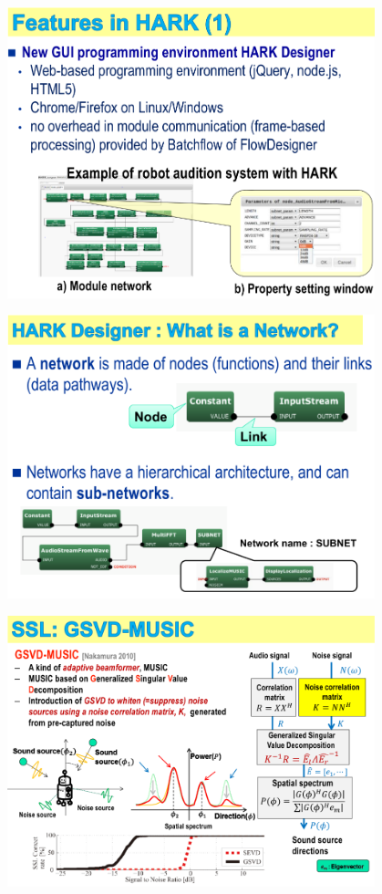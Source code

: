 \documentclass[xetex,mathserif,serif]{beamer}
\begin{document}
	\begin{frame}
		\begin{center}
			\includegraphics[width=0.8\textwidth]{okuno11.png}
		\end{center}
	\end{frame}

	\begin{frame}
		\begin{center}
			\includegraphics[width=0.8\textwidth]{okuno12.png}
		\end{center}
	\end{frame}

	\begin{frame}
		\begin{center}
			\includegraphics[width=0.8\textwidth]{okuno13.png}
		\end{center}
	\end{frame}
\end{document}
